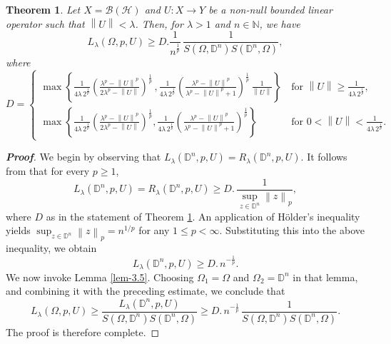 \documentclass[a4paper,11pt, reqno]{amsart}
\newtheorem{thm}{Theorem}[section]
\theoremstyle{definition}
\newcommand{\real}{{\operatorname{Re}\,}}
\newcommand{\norm}[1]{\left\lVert#1\right\rVert}
\begin{document}
	\begin{thm} \label{thm-1.1}
		Let $X=\mathcal{B}(\mathcal{H})$ and $U: X \rightarrow Y$ be a non-null bounded linear operator such that $\norm{U}< \lambda$. Then, for $\lambda>1$ and $n \in \mathbb{N}$, we have
		$$
		L_{\lambda}(\Omega, p,U) \geq D. \frac{1}{n^{\frac{1}{p}}}\,\frac{1}{S(\Omega,\mathbb{D}^n)S(\mathbb{D}^n,\Omega)},
		$$ where 
		$$
		D=\begin{cases}
			\max \left\{\frac{1}{4 \lambda\,2^{\frac{1}{p}}}\left(\frac{\lambda^p - \norm{U}^p}{2\lambda^p - \norm{U}}\right)^{\frac{1}{p}}\, , \frac{1}{4 \lambda\,2^{\frac{1}{p}}}\left(\frac{\lambda^p - \norm{U}^p}{\lambda^p - \norm{U}^p +1}\right)^{\frac{1}{p}}\, \frac{1}{\norm{U}}\right\}\,  & \text{for $\norm{U}\geq \frac{1}{4 \lambda\,2^{\frac{1}{p}}}$},\\[3mm]
			\max \left\{\frac{1}{4 \lambda\,2^{\frac{1}{p}}}\left(\frac{\lambda^p - \norm{U}^p}{2\lambda^p - \norm{U}}\right)^{\frac{1}{p}}, \frac{1}{4 \lambda\,2^{\frac{1}{p}}}\left(\frac{\lambda^p - \norm{U}^p}{\lambda^p - \norm{U}^p +1}\right)^{\frac{1}{p}}\right\} & \text{for $0<\norm{U}< \frac{1}{4 \lambda\,2^{\frac{1}{p}}}$}.
		\end{cases}
		$$
	\end{thm}
\begin{proof}[{\bf Proof}]
We begin by observing that $L_{\lambda}(\mathbb{D}^n, p,U)=R_{\lambda}(\mathbb{D}^n, p,U)$. It follows from \cite[Theorem 1.1]{Himadri-local-Banach-1} that for every $p \geq 1$,
\begin{equation*}
L_{\lambda}(\mathbb{D}^n, p,U)=R_{\lambda}(\mathbb{D}^n, p,U) \geq D.\, \frac{1}{\sup_{z \in \mathbb{D}^n}\norm{z}_{p}},
\end{equation*}
where $D$ as in the statement of Theorem \ref{thm-1.1}. An application of H\"{o}lder's inequality yields $\sup_{z \in \mathbb{D}^n}\norm{z}_{p}=n^{1/p}$ for any $1 \leq p < \infty$. Substituting this into the above inequality, we obtain
\begin{equation*}
	L_{\lambda}(\mathbb{D}^n, p,U) \geq D.\, n^{-\frac{1}{p}}.
	\end{equation*}
We now invoke Lemma \ref{lem-3.5}. Choosing $\Omega_{1}=\Omega$ and $\Omega_{2}=\mathbb{D}^n$ in that lemma, and combining it with the preceding estimate, we conclude that
\begin{equation*}
L_{\lambda}(\Omega, p,U) \geq  \frac{L_{\lambda}(\mathbb{D}^n, p,U)}{S(\Omega,\mathbb{D}^n)S(\mathbb{D}^n,\Omega)} \geq  D.\, n^{-\frac{1}{p}}\,\frac{1}{S(\Omega,\mathbb{D}^n)S(\mathbb{D}^n,\Omega)}. 
\end{equation*}
The proof is therefore complete.
\end{proof}	
\end{document}
